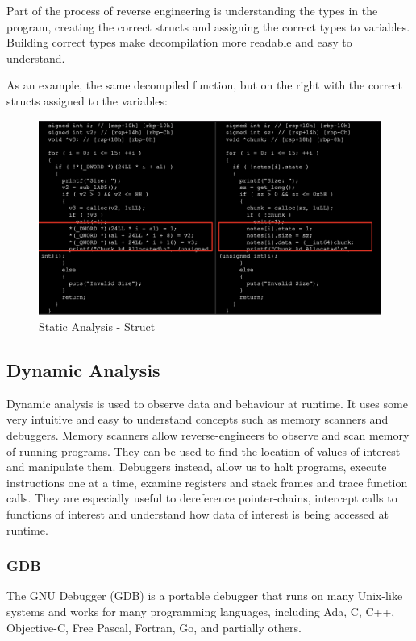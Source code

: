 \documentclass{article}
\begin{document}
Part of the process of reverse engineering is understanding the types in the program, creating the correct
structs and assigning the correct types to variables. Building correct types make decompilation more readable
and easy to understand.

As an example, the same decompiled function, but on the right with the correct structs assigned to the variables:
\begin{figure}[H]
\centering
\includegraphics[width=1\textwidth]{img/struct.jpg}
\caption{Static Analysis - Struct}
\label{fig:struct}
\end{figure}

\subsection{Dynamic Analysis} 

Dynamic analysis is used to observe data and behaviour at runtime. It uses some very intuitive and easy to 
understand concepts such as memory scanners and debuggers. Memory scanners allow reverse-engineers to observe 
and scan memory of running programs. They can be used to find the location of values of interest and manipulate them.
Debuggers instead, allow us to halt programs, execute instructions one at a time, examine registers and stack frames 
and trace function calls. They are especially useful to dereference pointer-chains, intercept calls to functions 
of interest and understand how data of interest is being accessed at runtime.

\subsubsection{GDB}

The GNU Debugger (GDB) is a portable debugger that runs on many Unix-like systems and works for many programming 
languages, including Ada, C, C++, Objective-C, Free Pascal, Fortran, Go, and partially others.
\end{document}
